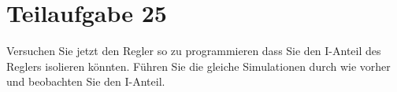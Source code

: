 \section{Teilaufgabe 25}
\begin{aufgabe}
    Versuchen Sie jetzt den Regler so zu programmieren dass Sie den I-Anteil 
    des Reglers isolieren könnten. Führen Sie die gleiche Simulationen durch 
    wie vorher und beobachten Sie den I-Anteil.
\end{aufgabe}
